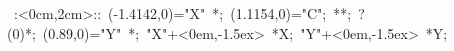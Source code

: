 \hbox{
\xy    <3cm,0cm>:<0cm,2cm>::
       (-1.4142,0)="X" *{\bullet}; (1.1154,0)="C";  
		  **\dir{-}; ?(0)*\dir{<};
       (0.89,0)="Y" *{\bullet};
       "X"+<0em,-1.5ex> *{X};
       "Y"+<0em,-1.5ex> *{Y};
       \endxy}
	   
